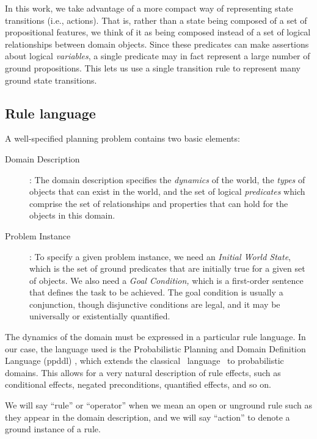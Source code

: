 In this work, we take advantage of a more compact way of representing
state transitions (i.e., actions).  That is, rather than a state being composed of a
set of propositional features, we think of it as being composed
instead of a set of logical relationships between domain objects.
Since these predicates can make assertions
about logical \emph{variables}, a single predicate may in fact
represent a large number of ground propositions.  This lets us use a
single transition rule to represent many ground state transitions.   



\subsection{Rule language}


  A well-specified planning problem contains two basic elements:

\begin{description}
\item [Domain Description]: The domain description specifies the {\em dynamics}
of the world, the \emph{types} of objects that can exist in the world,
and the set of logical \emph{predicates} which comprise the set of
relationships and properties that can hold for the objects in this
domain.  
\item [Problem Instance]: To specify a given problem instance, we need an
{\em Initial World State}, which is the set of ground predicates that are
initially true for a given set of objects. We also need a
{\em Goal Condition,} which is a first-order sentence that defines 
the task to be achieved.  The goal condition is usually a conjunction,
 though disjunctive conditions are legal, and it may be universally or existentially quantified.
\end{description}



The dynamics of the domain must be 
expressed in a particular rule language. In our case, 
the language used is the
Probabilistic Planning and Domain Definition Language ({\sc ppddl})
\cite{younes03}, which extends the classical 
 \strips\
language~\cite{fikes71,kushmerick95aij} to probabilistic domains.
This allows for a very natural description of rule effects, such as
conditional effects, negated preconditions, quantified effects, and so on.


We will say ``rule'' or ``operator'' when we mean an open or unground rule such as they appear in the domain description, and we will say ``action'' to denote a ground instance of a rule.


